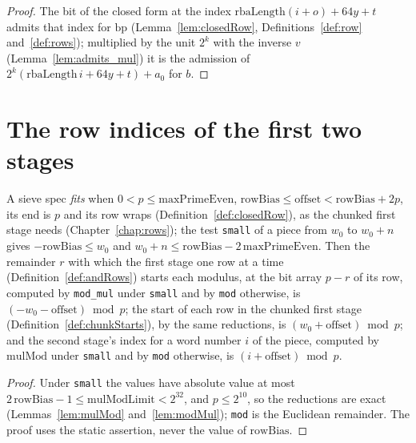 \begin{proof}
  \leanok
  The bit of the closed form at the index $\mathrm{rbaLength}(i + o) + 64 y + t$ admits that index
  for $\mathrm{bp}$ (Lemma~\ref{lem:closedRow}, Definitions~\ref{def:row} and~\ref{def:rows});
  multiplied by the unit $2^k$ with the inverse $v$ (Lemma~\ref{lem:admits_mul}) it is the admission
  of $2^k(\mathrm{rbaLength}\, i + 64 y + t) + a_0$ for $b$.
\end{proof}

\section{The row indices of the first two stages}\label{sec:rowIndices}

\begin{lemma}\label{lem:rowIndices}
  \leanok
  A sieve spec \emph{fits} when $0 < p \le \mathrm{maxPrimeEven}$,
  $\mathrm{rowBias} \le \mathrm{offset} < \mathrm{rowBias} + 2p$, its end is $p$ and its row wraps
  (Definition~\ref{def:closedRow}), as the chunked first stage needs (Chapter~\ref{chap:rows}); the
  test \verb|small| of a piece from $w_0$ to $w_0 + n$ gives $-\mathrm{rowBias} \le w_0$ and
  $w_0 + n \le \mathrm{rowBias} - 2\,\mathrm{maxPrimeEven}$. Then the remainder $r$ with which the
  first stage one row at a time (Definition~\ref{def:andRows}) starts each modulus, at the bit array
  $p - r$ of its row, computed by \verb|mod_mul| under \verb|small| and by \verb|mod| otherwise, is
  $(-w_0 - \mathrm{offset}) \bmod p$; the start of each row in the chunked first stage
  (Definition~\ref{def:chunkStarts}), by the same reductions, is $(w_0 + \mathrm{offset}) \bmod p$;
  and the second stage's index for a word number $i$ of the piece, computed by $\mathrm{mulMod}$
  under \verb|small| and by \verb|mod| otherwise, is $(i + \mathrm{offset}) \bmod p$.
\end{lemma}

\begin{proof}
  \leanok
  Under \verb|small| the values have absolute value at most
  $2\,\mathrm{rowBias} - 1 \le \mathrm{mulModLimit} < 2^{32}$, and $p \le 2^{10}$, so the reductions
  are exact (Lemmas~\ref{lem:mulMod} and~\ref{lem:modMul}); \verb|mod| is the Euclidean remainder.
  The proof uses the static assertion, never the value of $\mathrm{rowBias}$.
\end{proof}

